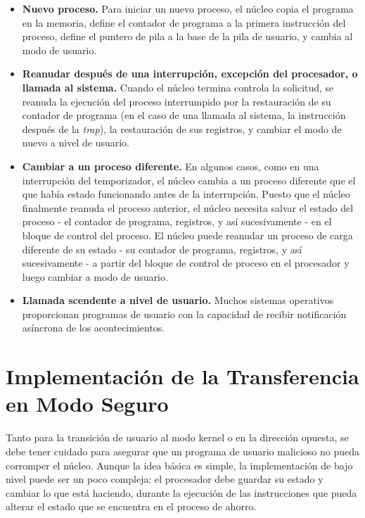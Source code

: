 \documentclass[10pt]{book}
\begin{document}
\begin{itemize}
\item \textbf{Nuevo proceso.} Para iniciar un nuevo proceso, el núcleo copia el programa en la memoria, define el contador de programa a la primera instrucción del proceso, define el puntero de pila a la base de la pila de usuario, y cambia al modo de usuario.

\item \textbf{Reanudar después de una interrupción, excepción del procesador, o llamada al sistema.} Cuando el núcleo termina controla la solicitud, se reanuda la ejecución del proceso interrumpido por la restauración de su contador de programa (en el caso de una llamada al sistema, la instrucción después de la \textit{trap}), la restauración de sus registros, y cambiar el modo de nuevo a nivel de usuario.

\item \textbf{Cambiar a un proceso diferente.} En algunos casos, como en una interrupción del temporizador, el núcleo cambia a un proceso diferente que el que había estado funcionando antes de la interrupción. Puesto que el núcleo finalmente reanuda el proceso anterior, el núcleo necesita salvar el estado del proceso - el contador de programa, registros, y así sucesivamente - en el bloque de control del proceso. El núcleo puede reanudar un proceso de carga diferente de su estado - su contador de programa, registros, y así sucesivamente - a partir del bloque de control de proceso en el procesador y luego cambiar a modo de usuario.

\item \textbf{Llamada scendente a nivel de usuario.} Muchos sistemas operativos proporcionan programas de usuario con la capacidad de recibir notificación asíncrona de los acontecimientos.
\end{itemize}

\section{Implementación de la Transferencia en Modo Seguro}
Tanto para la transición de usuario al modo kernel o en la dirección opuesta, se debe tener cuidado para asegurar que un programa de usuario malicioso no pueda corromper el núcleo. Aunque la idea básica es simple, la implementación de bajo nivel puede ser un poco compleja: el procesador debe guardar su estado y cambiar lo que está haciendo, durante la ejecución de las instrucciones que pueda alterar el estado que se encuentra en el proceso de ahorro.
\end{document}
